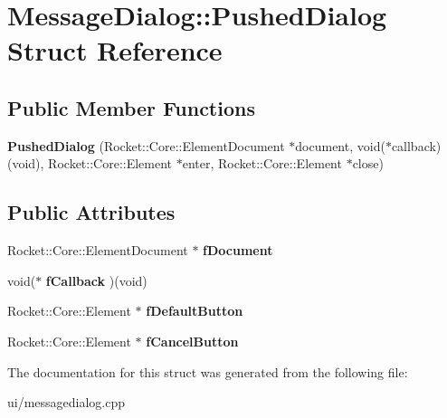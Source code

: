 \hypertarget{structMessageDialog_1_1PushedDialog}{\section{\-Message\-Dialog\-:\-:\-Pushed\-Dialog \-Struct \-Reference}
\label{structMessageDialog_1_1PushedDialog}
}
\subsection*{\-Public \-Member \-Functions}
\begin{DoxyCompactItemize}
\item 
\hypertarget{structMessageDialog_1_1PushedDialog_a39b2cb9577ec093037d920f6a545b126}{{\bfseries \-Pushed\-Dialog} (\-Rocket\-::\-Core\-::\-Element\-Document $\ast$document, void($\ast$callback)(void), \-Rocket\-::\-Core\-::\-Element $\ast$enter, \-Rocket\-::\-Core\-::\-Element $\ast$close)}\label{structMessageDialog_1_1PushedDialog_a39b2cb9577ec093037d920f6a545b126}

\end{DoxyCompactItemize}
\subsection*{\-Public \-Attributes}
\begin{DoxyCompactItemize}
\item 
\hypertarget{structMessageDialog_1_1PushedDialog_accc61aa987ba2083fdfe28a028868500}{\-Rocket\-::\-Core\-::\-Element\-Document $\ast$ {\bfseries f\-Document}}\label{structMessageDialog_1_1PushedDialog_accc61aa987ba2083fdfe28a028868500}

\item 
\hypertarget{structMessageDialog_1_1PushedDialog_a9dc1661826bf8495ecd553cc79b3f8e6}{void($\ast$ {\bfseries f\-Callback} )(void)}\label{structMessageDialog_1_1PushedDialog_a9dc1661826bf8495ecd553cc79b3f8e6}

\item 
\hypertarget{structMessageDialog_1_1PushedDialog_a932996ce3e4f2ca1f41eb8d8fb9bdeb5}{\-Rocket\-::\-Core\-::\-Element $\ast$ {\bfseries f\-Default\-Button}}\label{structMessageDialog_1_1PushedDialog_a932996ce3e4f2ca1f41eb8d8fb9bdeb5}

\item 
\hypertarget{structMessageDialog_1_1PushedDialog_a26ae441898b3f8304e8553f948597a5e}{\-Rocket\-::\-Core\-::\-Element $\ast$ {\bfseries f\-Cancel\-Button}}\label{structMessageDialog_1_1PushedDialog_a26ae441898b3f8304e8553f948597a5e}

\end{DoxyCompactItemize}


\-The documentation for this struct was generated from the following file\-:\begin{DoxyCompactItemize}
\item 
ui/messagedialog.\-cpp\end{DoxyCompactItemize}
